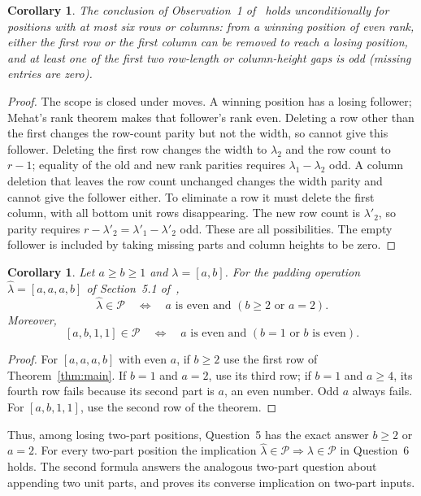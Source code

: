 \documentclass[11pt]{article}
\newtheorem{corollary}[theorem]{Corollary}
\newcommand{\PP}{\mathcal P}
\begin{document}
\begin{corollary}\label{cor:gap}
The conclusion of Observation~1 of~\cite{BGK} holds unconditionally
for positions with at most six rows or columns: from a winning position
of even rank, either the first row or the first column can be removed
to reach a losing position, and at least one of the first two row-length
or column-height gaps is odd (missing entries are zero).
\end{corollary}
\begin{proof}
The scope is closed under moves. A winning position has a losing follower;
Mehat's rank theorem makes that follower's rank even. Deleting a row
other than the first changes the row-count parity but not the width,
so cannot give this follower. Deleting the first row changes the width
to $\lambda_2$ and the row count to $r-1$; equality of the old and new
rank parities requires $\lambda_1-\lambda_2$ odd. A column deletion
that leaves the row count unchanged changes the width parity and cannot
give the follower either. To eliminate a row it must delete the first
column, with all bottom unit rows disappearing. The new row count is
$\lambda'_2$, so parity requires $r-\lambda'_2=\lambda'_1-\lambda'_2$
odd. These are all possibilities. The empty follower is included by
taking missing parts and column heights to be zero.
\end{proof}

\begin{corollary}\label{cor:pad}
Let $a\ge b\ge1$ and $\lambda=[a,b]$. For the padding operation
$\widehat\lambda=[a,a,a,b]$ of Section~5.1 of~\cite{BGK},
\[
 \widehat\lambda\in\PP
 \quad\Longleftrightarrow\quad
 a\text{ is even and }(b\ge2\text{ or }a=2).
\]
Moreover,
\[
 [a,b,1,1]\in\PP
 \quad\Longleftrightarrow\quad
 a\text{ is even and }(b=1\text{ or }b\text{ is even}).
\]
\end{corollary}
\begin{proof}
For $[a,a,a,b]$ with even $a$, if $b\ge2$ use the first row of
Theorem~\ref{thm:main}. If $b=1$ and $a=2$, use its third row;
if $b=1$ and $a\ge4$, its fourth row fails because its second part
is $a$, an even number. Odd $a$ always fails.
For $[a,b,1,1]$, use the second row of the theorem.
\end{proof}
Thus, among losing two-part positions, Question~5 has the exact answer
$b\ge2$ or $a=2$. For every two-part position the implication
$\widehat\lambda\in\PP\Rightarrow\lambda\in\PP$ in Question~6 holds.
The second formula answers the analogous two-part question about
appending two unit parts, and proves its converse implication on two-part inputs.
\end{document}
